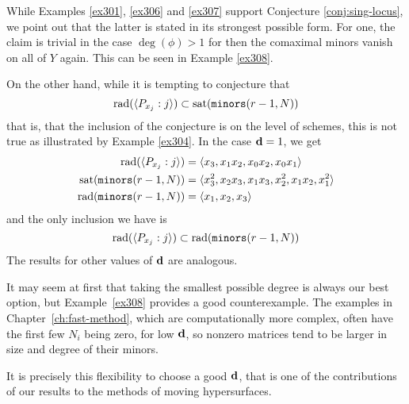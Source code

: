 \documentclass[fleqn,reqno]{amsart}
\begin{document}
\begin{example}[$\mt{ex315}$]
\label{ex315}
While Examples \ref{ex301}, \ref{ex306} and \ref{ex307} support Conjecture \ref{conj:sing-locus},
we point out that the latter is stated in its strongest possible form.
For one, the claim is trivial in the case $\deg(\phi)>1$
for then the comaximal minors vanish on all of $Y$ again.
This can be seen in Example \ref{ex308}.

On the other hand, while it is tempting to conjecture that
\[
	\operatorname{rad}(\langle P_{x_j}:j\rangle)\subset\operatorname{sat}(\mathop{\tt minors}(r-1,N))
\]
that is, that the inclusion of the conjecture is on the level of schemes,
this is not true as illustrated by Example \ref{ex304}.
In the case $\mathbf d=1$, we get
\begin{align*}
	\operatorname{rad}(\langle P_{x_j}:j\rangle)&=\langle {x}_{3},{x}_{1} {x}_{2},{x}_{0} {x}_{2},{x}_{0} {x}_{1}\rangle\\
	\operatorname{sat}(\mathop{\tt minors}(r-1,N))&=\langle{x}_{3}^{2},{x}_{2} {x}_{3},{x}_{1} {x}_{3},{x}_{2}^{2},{x}_{1}
      {x}_{2},{x}_{1}^{2}\rangle\\
	\operatorname{rad}(\mathop{\tt minors}(r-1,N))&=\langle {x}_{1},{x}_{2},{x}_{3}\rangle
\end{align*}
and the only inclusion we have is
\[
	\operatorname{rad}(\langle P_{x_j}:j\rangle)\subset\operatorname{rad}(\mathop{\tt minors}(r-1,N))
\]
The results for other values of $\mathbf d$ are analogous.
\end{example}


\begin{example}
\label{ex317}
It may seem at first that taking the smallest possible degree is always our best option,
but Example~\ref{ex308} provides a good counterexample.
The examples in Chapter~\ref{ch:fast-method}, which are computationally more complex,
often have the first few $N_i$ being zero, for low $\mathbf d$,
so nonzero matrices tend to be larger in size and degree of their minors.

It is precisely this flexibility to choose a good $\mathbf d$,
that is one of the contributions of
our results to the methods of moving hypersurfaces.
\end{example}
\end{document}
